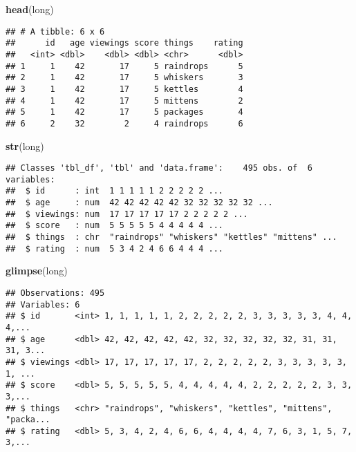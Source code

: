 \documentclass[]{article}
\newenvironment{Shaded}{\begin{snugshade}}{\end{snugshade}}
\newcommand{\KeywordTok}[1]{\textcolor[rgb]{0.13,0.29,0.53}{\textbf{#1}}}
\newcommand{\NormalTok}[1]{#1}
\begin{document}
\begin{Shaded}
\begin{Highlighting}[]
\KeywordTok{head}\NormalTok{(long)}
\end{Highlighting}
\end{Shaded}

\begin{verbatim}
## # A tibble: 6 x 6
##      id   age viewings score things    rating
##   <int> <dbl>    <dbl> <dbl> <chr>      <dbl>
## 1     1    42       17     5 raindrops      5
## 2     1    42       17     5 whiskers       3
## 3     1    42       17     5 kettles        4
## 4     1    42       17     5 mittens        2
## 5     1    42       17     5 packages       4
## 6     2    32        2     4 raindrops      6
\end{verbatim}

\begin{Shaded}
\begin{Highlighting}[]
\KeywordTok{str}\NormalTok{(long)}
\end{Highlighting}
\end{Shaded}

\begin{verbatim}
## Classes 'tbl_df', 'tbl' and 'data.frame':    495 obs. of  6 variables:
##  $ id      : int  1 1 1 1 1 2 2 2 2 2 ...
##  $ age     : num  42 42 42 42 42 32 32 32 32 32 ...
##  $ viewings: num  17 17 17 17 17 2 2 2 2 2 ...
##  $ score   : num  5 5 5 5 5 4 4 4 4 4 ...
##  $ things  : chr  "raindrops" "whiskers" "kettles" "mittens" ...
##  $ rating  : num  5 3 4 2 4 6 6 4 4 4 ...
\end{verbatim}

\begin{Shaded}
\begin{Highlighting}[]
\KeywordTok{glimpse}\NormalTok{(long)}
\end{Highlighting}
\end{Shaded}

\begin{verbatim}
## Observations: 495
## Variables: 6
## $ id       <int> 1, 1, 1, 1, 1, 2, 2, 2, 2, 2, 3, 3, 3, 3, 3, 4, 4, 4,...
## $ age      <dbl> 42, 42, 42, 42, 42, 32, 32, 32, 32, 32, 31, 31, 31, 3...
## $ viewings <dbl> 17, 17, 17, 17, 17, 2, 2, 2, 2, 2, 3, 3, 3, 3, 3, 1, ...
## $ score    <dbl> 5, 5, 5, 5, 5, 4, 4, 4, 4, 4, 2, 2, 2, 2, 2, 3, 3, 3,...
## $ things   <chr> "raindrops", "whiskers", "kettles", "mittens", "packa...
## $ rating   <dbl> 5, 3, 4, 2, 4, 6, 6, 4, 4, 4, 4, 7, 6, 3, 1, 5, 7, 3,...
\end{verbatim}
\end{document}
